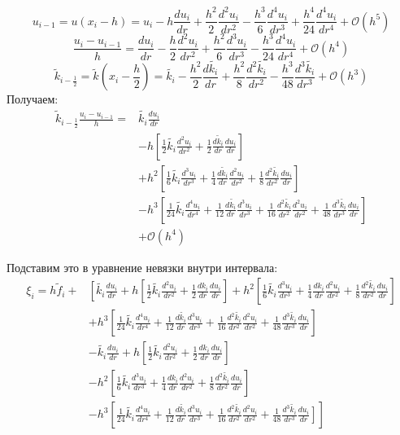 \[
  u_{i-1} = u(x_i - h) = u_i - h \frac{d u_i}{d r} + \frac{h^2 }{2} \frac{d^2 u_i}{d r^2}
  - \frac{h^3 }{6} \frac{d^4 u_i}{d r^3} + \frac{h^4 }{24} \frac{d^4 u_i}{d r^4} + \mathcal{O}(h^5)
\]
\[
  \frac{u_{i} - u_{i-1}}{h} = \frac{d u_i}{dr} - \frac{h}{2} \frac{d^2 u_i}{dr^2} 
  + \frac{h^2}{6}\frac{d^3 u_i}{dr^3} - \frac{h^3}{24}\frac{d^4 u_i}{dr^4} + \mathcal{O}(h^4)
\]
\[
  \tilde{k}_{i-\frac{1}{2}} = \tilde{k}(x_i - \frac{h}{2}) = \tilde{k_i} - \frac{h^2 }{2}\frac{d \tilde{k_i}}{d r} + \frac{h^2 }{8}\frac{d^2 \tilde{k_i}}{d r^2}
  - \frac{h^3 }{48}\frac{d^3 \tilde{k_i}}{d r^3} + \mathcal{O}(h^3)
\]
Получаем:
\begin{align*}
  \tilde{k}_{i-\frac{1}{2}} \frac{u_{i} - u_{i-1}}{h} = &\tilde{k_i} \frac{du_i}{dr} \\
  &- h \left [ \frac{1}{2}\tilde{k_i} \frac{d^2 u_i}{d r^2} + \frac{1}{2}\frac{d \tilde{k}_i}{dr} \frac{d u_i}{d r} \right ] \\
  &+ h^2 \left [ \frac{1}{6}\tilde{k_i} \frac{d^3 u_i}{d r^3} + \frac{1}{4}\frac{d \tilde{k}_i}{dr} \frac{d^2 u_i}{d r^2} + \frac{1}{8}\frac{d^2 \tilde{k_i}}{dr^2} \frac{d u_i}{d r} \right ] \\
  &- h^3 \left [ \frac{1}{24}\tilde{k_i} \frac{d^4 u_i}{d r^4} + \frac{1}{12}\frac{d \tilde{k_i}}{dr} \frac{d^3 u_i}{d r^3} + \frac{1}{16}\frac{d^2 \tilde{k_i}}{dr^2} \frac{d^2 u_i}{d r^2} + \frac{1}{48}\frac{d^3 \tilde{k_i}}{dr^3} \frac{d u_i}{d r}\right ] \\
  &+ \mathcal{O}(h^4)
\end{align*}

Подставим это в уравнение невязки внутри интервала:
\begin{align*}
  \xi_i = h \tilde{f}_i +
  &\left [ \tilde{k_i} \frac{du_i}{dr} \right . + h \left [ \frac{1}{2}\tilde{k_i} \frac{d^2 u_i}{d r^2} + \frac{1}{2}\frac{dk_i}{dr} \frac{d u_i}{d r} \right ] 
    + h^2 \left [ \frac{1}{6}\tilde{k_i} \frac{d^3 u_i}{d r^3} + \frac{1}{4}\frac{dk_i}{dr} \frac{d^2 u_i}{d r^2} + \frac{1}{8}\frac{d^2 \tilde{k_i}}{dr^2} \frac{d u_i}{d r} \right ] \\
    &+ h^3 \left [ \frac{1}{24}\tilde{k_i} \frac{d^4 u_i}{d r^4} + \frac{1}{12}\frac{d \tilde{k_i}}{dr} \frac{d^3 u_i}{d r^3} + \frac{1}{16}\frac{d^2 \tilde{k_i}}{dr^2} \frac{d^2 u_i}{d r^2} + \frac{1}{48}\frac{d^3 \tilde{k_i}}{dr^3} \frac{d u_i}{d r} \right ] \\
    &- \tilde{k_i} \frac{du_i}{dr} + h \left [ \frac{1}{2}\tilde{k_i} \frac{d^2 u_i}{d r^2} + \frac{1}{2}\frac{dk_i}{dr} \frac{d u_i}{d r} \right ] \\
    &- h^2 \left [ \frac{1}{6}\tilde{k_i} \frac{d^3 u_i}{d r^3} + \frac{1}{4}\frac{dk_i}{dr} \frac{d^2 u_i}{d r^2} + \frac{1}{8}\frac{d^2 \tilde{k_i}}{dr^2} \frac{d u_i}{d r} \right ] \\
    &- h^3 \left [ \frac{1}{24}\tilde{k_i} \frac{d^4 u_i}{d r^4} + \frac{1}{12}\frac{d \tilde{k_i}}{dr} \frac{d^3 u_i}{d r^3} + \frac{1}{16}\frac{d^2 \tilde{k_i}}{dr^2} \frac{d^2 u_i}{d r^2} + \frac{1}{48}\frac{d^3 \tilde{k_i}}{dr^3} \left . \frac{d u_i}{d r}\right ] \right ]
\end{align*}

